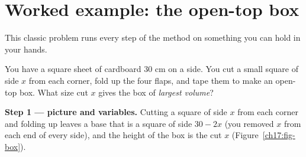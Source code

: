 \section{Worked example: the open-top box}

This classic problem runs every step of the method on something you can hold in
your hands.

\begin{example}\label{ch17:ex-box}
You have a square sheet of cardboard $30$ cm on a side. You cut a small square of
side $x$ from each corner, fold up the four flaps, and tape them to make an open-top
box. What size cut $x$ gives the box of \emph{largest volume}?
\end{example}

\textbf{Step 1 --- picture and variables.} Cutting a square of side $x$ from each
corner and folding up leaves a base that is a square of side $30-2x$ (you removed $x$
from each end of every side), and the height of the box is the cut $x$
(Figure~\ref{ch17:fig-box}).

